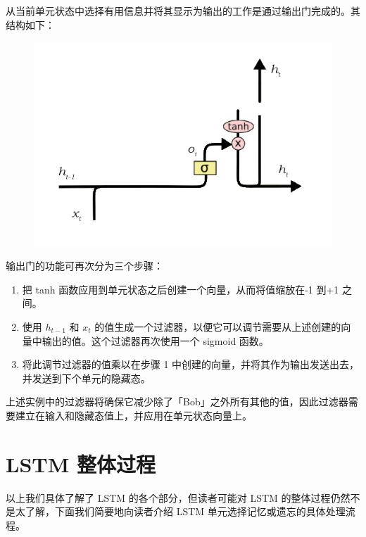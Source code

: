\documentclass{article}
\begin{document}
从当前单元状态中选择有用信息并将其显示为输出的工作是通过输出门完成的。其结构如下：
\begin{figure}[H]
	\centering
	\includegraphics[scale=0.3]{5.png}
\end{figure}
输出门的功能可再次分为三个步骤：

\begin{enumerate}
\item 把 tanh 函数应用到单元状态之后创建一个向量，从而将值缩放在-1 到+1 之间。
\item 使用 $h_{t-1}$ 和 $x_t$ 的值生成一个过滤器，以便它可以调节需要从上述创建的向量中输出的值。这个过滤器再次使用一个 sigmoid 函数。
\item 将此调节过滤器的值乘以在步骤 1 中创建的向量，并将其作为输出发送出去，并发送到下个单元的隐藏态。
\end{enumerate}

上述实例中的过滤器将确保它减少除了「Bob」之外所有其他的值，因此过滤器需要建立在输入和隐藏态值上，并应用在单元状态向量上。
\section{LSTM 整体过程}

以上我们具体了解了 LSTM 的各个部分，但读者可能对 LSTM 的整体过程仍然不是太了解，下面我们简要地向读者介绍 LSTM 单元选择记忆或遗忘的具体处理流程。
\end{document}
